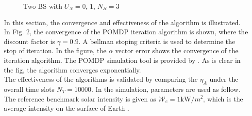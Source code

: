 \documentclass[conference]{IEEEtran}
\begin{document}
\begin{figure}[t]
\centering
{}
\caption{Two BS with \(U_N = 0,\,1,\, N_B = 3\)}
\end{figure}
In this section, the convergence and effectiveness of the algorithm is illustrated.
In Fig. 2, the convergence of the POMDP iteration algorithm is shown, where the discount factor is \(\gamma = 0.9\).
A bellman stoping criteria is used to determine the stop of iteration.
In the figure, the \(\alpha\) vector error shows the convergence of the iteration algorithm.
The POMDP simulation tool is provided by \cite{pomdptool}.
As is clear in the fig, the algorithm converges exponentially.\\
\indent The effectiveness of the algorithms is validated by comparing the \(\eta_A\)
under the overall time slots \(N_T = 10000\).
In the simulation, parameters are used as follow.
The reference benchmark solar intensity is given as \(\mathcal{W}_e = 1\mbox{kW}/m^2\),
which is the average intensity on the surface of Earth \cite{electric}.
\end{document}
